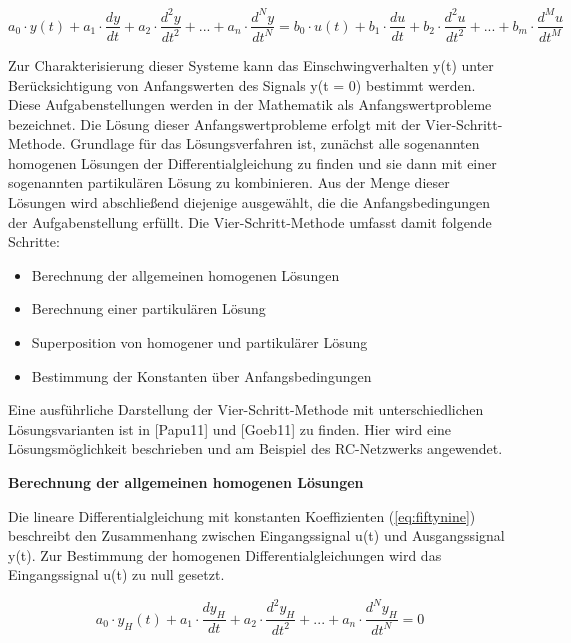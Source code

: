 \begin{equation}\label{eq:fiftynine}
a_{0}\cdot y(t) + a_{1}\cdot \frac{dy}{dt}+a_{2}\cdot \frac{d^2y}{dt^2}+ ... +a_{n}\cdot \frac{d^Ny}{dt^N}=
b_{0}\cdot u(t) + b_{1}\cdot \frac{du}{dt}+b_{2}\cdot \frac{d^2u}{dt^2}+ ... +b_{m}\cdot \frac{d^Mu}{dt^M}
\end{equation}

\noindent Zur Charakterisierung dieser Systeme kann das Einschwingverhalten y(t) unter Berücksichtigung von Anfangswerten des Signals y(t = 0) bestimmt werden. Diese Aufgabenstellungen werden in der Mathematik als Anfangswertprobleme bezeichnet. Die Lösung dieser Anfangswertprobleme erfolgt mit der Vier-Schritt-Methode. Grundlage für das Lösungsverfahren ist, zunächst alle sogenannten homogenen Lösungen der Differentialgleichung zu finden und sie dann mit einer sogenannten partikulären Lösung zu kombinieren. Aus der Menge dieser Lösungen wird abschließend diejenige ausgewählt, die die Anfangsbedingungen der Aufgabenstellung erfüllt. Die Vier-Schritt-Methode umfasst damit folgende Schritte:

\begin{itemize}
  \item Berechnung der allgemeinen homogenen Lösungen
  \item Berechnung einer partikulären Lösung
  \item Superposition von homogener und partikulärer Lösung
  \item Bestimmung der Konstanten über Anfangsbedingungen
\end{itemize}

\noindent Eine ausführliche Darstellung der Vier-Schritt-Methode mit unterschiedlichen Lösungsvarianten ist in [Papu11] und [Goeb11] zu finden. Hier wird eine Lösungsmöglichkeit beschrieben und am Beispiel des RC-Netzwerks angewendet.\bigskip

{\selectfont
\noindent\textbf{Berechnung der allgemeinen homogenen Lösungen}}\smallskip

\noindent Die lineare Differentialgleichung mit konstanten Koeffizienten (\ref{eq:fiftynine}) beschreibt den Zusammenhang
zwischen Eingangssignal u(t) und Ausgangssignal y(t). Zur Bestimmung der homogenen Differentialgleichungen wird das Eingangssignal u(t) zu null gesetzt.

\begin{equation}\label{eq:sixty}
a_{0}\cdot y_{H}(t) + a_{1}\cdot \frac{dy_{H}}{dt}+a_{2}\cdot \frac{d^2y_{H}}{dt^2}+ ... +a_{n}\cdot \frac{d^Ny_{H}}{dt^N}=
0
\end{equation}

